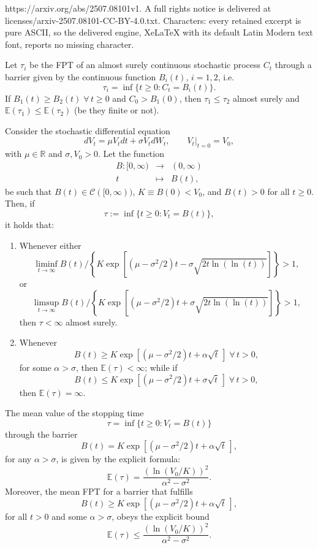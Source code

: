 \documentclass[10pt,a4paper]{amsart}
\begin{document}
https://arxiv.org/abs/2507.08101v1. A full rights notice is delivered at licenses/arxiv-2507.08101-CC-BY-4.0.txt. Characters: every retained excerpt is pure ASCII, so the delivered engine, XeLaTeX with its default Latin Modern text font, reports no missing character.
\begin{lemma}
\label{lemma:rem2barriers}
Let $\tau_i$ be the FPT of an almost surely continuous stochastic process $C_t$ through a barrier given by the continuous function $B_i(t)$, $i=1,2$, i.e. 
$$
\tau_i = \inf \{t \ge 0 : C_t = B_i(t)\}.
$$
If $B_1(t) \geq B_2(t)\;\forall \, t \geq 0$ and $C_0 > B_1(0)$, then $\tau_1 \leq \tau_2$ almost surely and $\mathbb{E}(\tau_1) \leq \mathbb{E}(\tau_2)$ (be they finite or not). 
\end{lemma}

\begin{theorem}\label{mainfpt}
Consider the stochastic differential equation
$$
dV_t=\mu V_t dt + \sigma V_t dW_t, \qquad \left. V_t \right|_{t=0}= V_0,
$$
with $\mu \in \mathbb{R}$ and $\sigma, V_0>0$. Let the function
\begin{eqnarray}\nonumber
B:[0,\infty) &\longrightarrow& (0,\infty) \\ \nonumber
t &\longmapsto& B(t),
\end{eqnarray}
be such that $B(t) \in \mathcal{C}([0,\infty))$, $K \equiv B(0) < V_0$, and $B(t)>0$ for all $t \ge 0$. Then, if
$$
\tau := \inf \{t \ge 0 : V_t = B(t)\},
$$
it holds that:
\begin{enumerate}
\item[(a)] Whenever either
$$
\liminf_{t \to \infty} B(t) \Big/ \left\{ K \exp \left[(\mu-\sigma^2/2)t - \sigma \sqrt{2t \ln(\ln(t))}\right] \right\} >1,
$$
or
$$
\limsup_{t \to \infty} B(t) \Big/ \left\{ K \exp \left[(\mu-\sigma^2/2)t + \sigma \sqrt{2t \ln(\ln(t))}\right] \right\} >1,
$$
then $\tau < \infty$ almost surely.
\item[(b)] Whenever
$$
B(t) \ge K \exp \left[(\mu-\sigma^2/2)t + \alpha \sqrt{t} \, \right]\;\forall \, t > 0,
$$
for some $\alpha > \sigma$, then $\mathbb{E}(\tau)<\infty$; while if
$$
B(t) \le K \exp \left[(\mu-\sigma^2/2)t + \sigma \sqrt{t} \, \right]\;\forall \, t > 0, 
$$
then $\mathbb{E}(\tau)=\infty$.
\end{enumerate}
\end{theorem}

\begin{corollary}
\label{cor:mainfpt}
The mean value of the stopping time
$$
\tau = \inf \{t \ge 0 : V_t = B(t)\}
$$
through the barrier
$$
B(t) = K \exp \left[(\mu-\sigma^2/2)t + \alpha \sqrt{t} \, \right],
$$
for any $\alpha > \sigma$, is given by the explicit formula:
$$
\mathbb{E}(\tau) = \frac{(\ln(V_0/K))^2}{\alpha^2 - \sigma^2}.
$$
Moreover, the mean FPT for a barrier that fulfills
$$
B(t) \ge K \exp \left[(\mu-\sigma^2/2)t + \alpha \sqrt{t} \, \right],
$$
for all $t > 0$ and some $\alpha > \sigma$, obeys the explicit bound
$$
\mathbb{E}(\tau) \le \frac{(\ln(V_0/K))^2}{\alpha^2 - \sigma^2}.
$$
\end{corollary}
\end{document}
